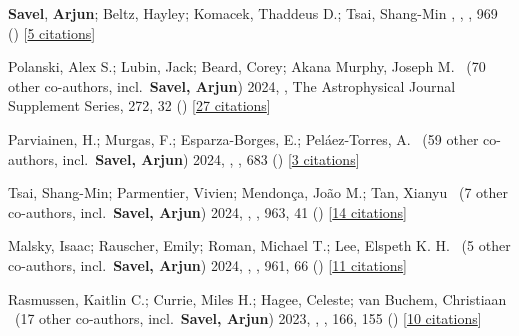 \item[{\color{numcolor}\scriptsize33}] \textbf{Savel}, \textbf{Arjun}; Beltz, Hayley; Komacek, Thaddeus D.; Tsai, Shang-Min , , \apj, {969} () [\href{https://ui.adsabs.harvard.edu/abs/2024ApJ...969L..27S}{5 citations}]

\item[{\color{numcolor}\scriptsize32}] Polanski, Alex S.; Lubin, Jack; Beard, Corey; Akana Murphy, Joseph M. \etal\ ({70} other co-authors, incl.\ \textbf{Savel, Arjun}) 2024, , The Astrophysical Journal Supplement Series, {272}, 32 () [\href{https://ui.adsabs.harvard.edu/abs/2024ApJS..272...32P}{27 citations}]

\item[{\color{numcolor}\scriptsize31}] Parviainen, H.; Murgas, F.; Esparza-Borges, E.; Pel{\'a}ez-Torres, A. \etal\ ({59} other co-authors, incl.\ \textbf{Savel, Arjun}) 2024, , \aanda, {683} () [\href{https://ui.adsabs.harvard.edu/abs/2024A&A...683A.170P}{3 citations}]

\item[{\color{numcolor}\scriptsize30}] Tsai, Shang-Min; Parmentier, Vivien; Mendon{\c{c}}a, Jo{\~a}o M.; Tan, Xianyu \etal\ ({7} other co-authors, incl.\ \textbf{Savel, Arjun}) 2024, , \apj, {963}, 41 () [\href{https://ui.adsabs.harvard.edu/abs/2024ApJ...963...41T}{14 citations}]

\item[{\color{numcolor}\scriptsize29}] Malsky, Isaac; Rauscher, Emily; Roman, Michael T.; Lee, Elspeth K. H. \etal\ ({5} other co-authors, incl.\ \textbf{Savel, Arjun}) 2024, , \apj, {961}, 66 () [\href{https://ui.adsabs.harvard.edu/abs/2024ApJ...961...66M}{11 citations}]

\item[{\color{numcolor}\scriptsize28}] Rasmussen, Kaitlin C.; Currie, Miles H.; Hagee, Celeste; van Buchem, Christiaan \etal\ ({17} other co-authors, incl.\ \textbf{Savel, Arjun}) 2023, , \aj, {166}, 155 () [\href{https://ui.adsabs.harvard.edu/abs/2023AJ....166..155R}{10 citations}]

